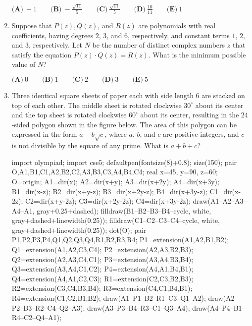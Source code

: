 \documentclass{article}
\begin{document}
\begin{enumerate}[label=\arabic*., itemsep=0.5em]
\(\textbf{(A)}\ {-}1 \qquad\textbf{(B)}\ {-}\frac{\sqrt{11}}{5} \qquad\textbf{(C)}\ \frac{\sqrt{11}}{5} \qquad\textbf{(D)}\
\frac{10}{11} \qquad\textbf{(E)}\ 1\)\par \vspace{0.5em}\item Suppose that \(P(z), Q(z)\), and \(R(z)\) are polynomials with real coefficients, having degrees \(2\), \(3\), and \(6\), respectively, and constant terms \(1\), \(2\), and \(3\), respectively. Let \(N\) be the number of distinct complex numbers \(z\) that satisfy the equation \(P(z) \cdot Q(z)=R(z)\). What is the minimum possible value of \(N\)?

\(\textbf{(A)}\: 0\qquad\textbf{(B)} \: 1\qquad\textbf{(C)} \: 2\qquad\textbf{(D)} \: 3\qquad\textbf{(E)} \: 5\)\par \vspace{0.5em}\item Three identical square sheets of paper each with side length \(6\) are stacked on top of each other. The middle sheet is rotated clockwise \(30^\circ\) about its center and the top sheet is rotated clockwise \(60^\circ\) about its center, resulting in the \(24\)-sided polygon shown in the figure below. The area of this polygon can be expressed in the form \(a-b\sqrt{c}\), where \(a\), \(b\), and \(c\) are positive integers, and \(c\) is not divisible by the square of any prime. What is \(a+b+c\)?
\begin{center}

\begin{center}
\begin{asy}
import olympiad;
import cse5;
defaultpen(fontsize(8)+0.8); size(150);
pair O,A1,B1,C1,A2,B2,C2,A3,B3,C3,A4,B4,C4;
real x=45, y=90, z=60; O=origin; 
A1=dir(x); A2=dir(x+y); A3=dir(x+2y); A4=dir(x+3y);
B1=dir(x-z); B2=dir(x+y-z); B3=dir(x+2y-z); B4=dir(x+3y-z);
C1=dir(x-2z); C2=dir(x+y-2z); C3=dir(x+2y-2z); C4=dir(x+3y-2z);
draw(A1--A2--A3--A4--A1, gray+0.25+dashed);
filldraw(B1--B2--B3--B4--cycle, white, gray+dashed+linewidth(0.25));
filldraw(C1--C2--C3--C4--cycle, white, gray+dashed+linewidth(0.25));
dot(O);
pair P1,P2,P3,P4,Q1,Q2,Q3,Q4,R1,R2,R3,R4;
P1=extension(A1,A2,B1,B2); Q1=extension(A1,A2,C3,C4); 
P2=extension(A2,A3,B2,B3); Q2=extension(A2,A3,C4,C1); 
P3=extension(A3,A4,B3,B4); Q3=extension(A3,A4,C1,C2); 
P4=extension(A4,A1,B4,B1); Q4=extension(A4,A1,C2,C3); 
R1=extension(C2,C3,B2,B3); R2=extension(C3,C4,B3,B4); 
R3=extension(C4,C1,B4,B1); R4=extension(C1,C2,B1,B2);
draw(A1--P1--B2--R1--C3--Q1--A2);
draw(A2--P2--B3--R2--C4--Q2--A3);
draw(A3--P3--B4--R3--C1--Q3--A4);
draw(A4--P4--B1--R4--C2--Q4--A1);
\end{asy}
\end{center}


\end{center}
\end{enumerate}
\end{document}
